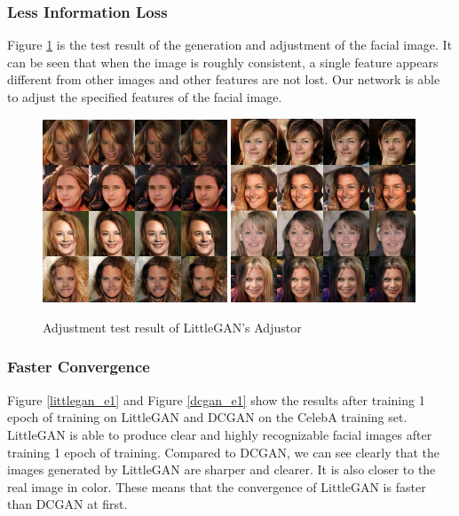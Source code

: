 \subsubsection*{Less Information Loss}
Figure \ref{adjust} is the test result of the generation and adjustment of the facial image.
It can be seen that when the image is roughly consistent, a single feature appears different from other images and other features are not lost.
Our network is able to adjust the specified features of the facial image.

\begin{figure}
    \begin{center}
    \includegraphics[width=0.49\textwidth]{figures/result_adjust_1.png}
    \includegraphics[width=0.49\textwidth]{figures/result_adjust_2.png}
    \caption{Adjustment test result of LittleGAN's Adjustor}
    \label{adjust}
    \end{center}
\end{figure}

\subsubsection*{Faster Convergence}
Figure \ref{littlegan_e1} and Figure \ref{dcgan_e1} show the results after training 1 epoch of training on LittleGAN and DCGAN on the CelebA training set.
LittleGAN is able to produce clear and highly recognizable facial images after training 1 epoch of training.
Compared to DCGAN, we can see clearly that the images generated by LittleGAN are sharper and clearer.
It is also closer to the real image in color.
These means that the convergence of LittleGAN is faster than DCGAN at first.

